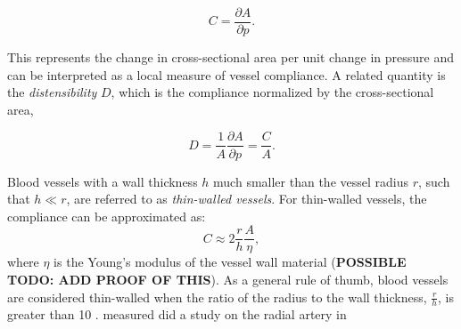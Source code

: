 \begin{equation}
C = \frac{\partial A}{\partial p}.
\end{equation}

This represents the change in cross-sectional area per unit change in pressure and can be interpreted as a local measure of vessel compliance. A related quantity is the \textit{distensibility} $D$, which is the compliance normalized by the cross-sectional area,

\begin{equation}
D = \frac{1}{A}\frac{\partial A}{\partial p}
= \frac{C}{A}.
\end{equation}

Blood vessels with a wall thickness $h$ much smaller than the vessel radius $r$, such that $h \ll r$, are referred to as \textit{thin-walled vessels}. For thin-walled vessels, the compliance can be approximated as:
\begin{equation}
C \approx 2 \frac{r}{h} \frac{A}{\eta},
\end{equation}
where $\eta$ is the Young's modulus of the vessel wall material (\textbf{POSSIBLE TODO: ADD PROOF OF THIS}). As a general rule of thumb, blood vessels are considered thin-walled when the ratio of the radius to the wall thickness, $\frac{r}{h}$, is greater than 10 \parencite{ibrahim_stress_2015}. \textcite{getachew_diameter_2018} measured did a study on the radial artery in 